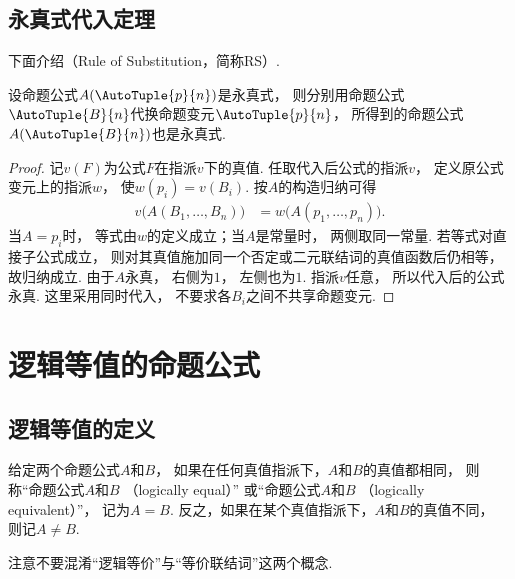 \subsection{永真式代入定理}
下面介绍（Rule of Substitution，简称RS）.
\begin{theorem}
设命题公式\(A(\AutoTuple{p}{n})\)是永真式，
则分别用命题公式\(\AutoTuple{B}{n}\)代换命题变元\(\AutoTuple{p}{n}\)，
所得到的命题公式\(A(\AutoTuple{B}{n})\)也是永真式.
    \begin{proof}
        记\(v(F)\)为公式\(F\)在指派\(v\)下的真值.
        任取代入后公式的指派\(v\)，
        定义原公式变元上的指派\(w\)，
        使\(w(p_i)=v(B_i)\).
        按\(A\)的构造归纳可得
        \begin{align*}
            v\bigl(A(B_1,\dotsc,B_n)\bigr) &= w\bigl(A(p_1,\dotsc,p_n)\bigr).
        \end{align*}
        当\(A=p_i\)时，
        等式由\(w\)的定义成立；当\(A\)是常量时，
        两侧取同一常量.
        若等式对直接子公式成立，
        则对其真值施加同一个否定或二元联结词的真值函数后仍相等，
        故归纳成立.
        由于\(A\)永真，
        右侧为\(1\)，
        左侧也为\(1\).
        指派\(v\)任意，
        所以代入后的公式永真.
        这里采用同时代入，
        不要求各\(B_i\)之间不共享命题变元.
    \end{proof}
\end{theorem}

\section{逻辑等值的命题公式}
\subsection{逻辑等值的定义}
\begin{definition}
给定两个命题公式\(A\)和\(B\)，
如果在任何真值指派下，\(A\)和\(B\)的真值都相同，
则称“命题公式\(A\)和\(B\) （logically equal）”
或“命题公式\(A\)和\(B\) （logically equivalent）”，
记为\(A = B\).
反之，如果在某个真值指派下，\(A\)和\(B\)的真值不同，
则记\(A \neq B\).
\end{definition}
\begin{remark}
注意不要混淆“逻辑等价”与“等价联结词”这两个概念.
\end{remark}

